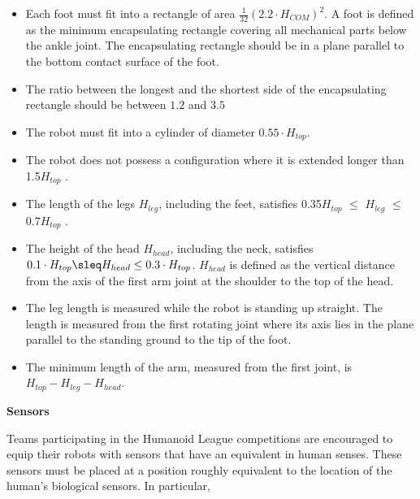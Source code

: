 \begin{itemize}
\item Each foot must fit into a rectangle of area $\tfrac{1}{32} (2.2 \cdot H_{COM})^2$.
      A foot is defined as the minimum encapsulating rectangle covering all
      mechanical parts below the ankle joint.
      The encapsulating rectangle should be in a plane parallel to the bottom
      contact surface of the foot.
\item The ratio between the longest and the shortest side of the encapsulating
      rectangle should be between $1.2$ and $3.5$
\item The robot must fit into a cylinder of diameter $0.55 \cdot H_{top}$.
\item The robot does not possess a configuration where it is extended longer than 1.5{\textperiodcentered}$H_{top}$ .
\item The length of the legs $H_{leg}$, including the feet, satisfies 0.35{\textperiodcentered}$H_{top}$ ${\leq}$ $H_{leg}$ ${\leq}$ 0.7{\textperiodcentered}$H_{top}$ .
\item The height of the head $H_{head}$, including the neck,
  satisfies $0.1 \cdot H_{top} \sleq H_{head} \leq 0.3 \cdot H_{top}$.
  $H_{head}$ is defined as the vertical distance from the axis of the first arm
  joint at the shoulder to the top of the head.
\item The leg length is measured while the robot is standing up straight. The length is measured from the first rotating joint where its axis lies in the plane parallel to the standing ground to the tip of the foot.
\item The minimum length of the arm, measured from the first joint, is $H_{top} - H_{leg} - H_{head}$.
\end{itemize}


{\bfseries Sensors}

\headlinebox

Teams participating in the Humanoid League competitions are encouraged to equip their robots with sensors that have an equivalent in human senses. These sensors must be placed at a position roughly equivalent to the location of the human{\textquoteright}s biological sensors. In particular, 

